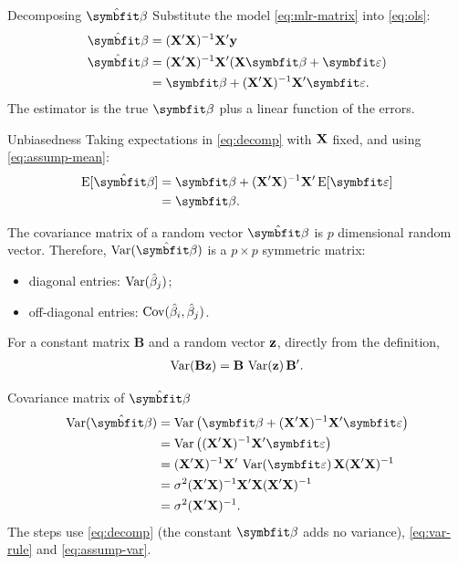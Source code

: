 \begin{frame}{Decomposing $\hat{\bbeta}$}
    Substitute the model \eqref{eq:mlr-matrix} into \eqref{eq:ols}:
    \begin{align}
        \hat{\bbeta} &= (\bX'\bX)^{-1}\bX' \by \notag\\
        \hat{\bbeta} &= (\bX'\bX)^{-1}\bX'(\bX\bbeta + \bvarepsilon) \notag\\
        &= \bbeta + (\bX'\bX)^{-1}\bX'\bvarepsilon. \label{eq:decomp}
    \end{align}
    The estimator is the true $\bbeta$ plus a linear function of the errors.
\end{frame}


\begin{frame}{Unbiasedness}
    Taking expectations in \eqref{eq:decomp} with $\mathbf{X}$ fixed, and using \eqref{eq:assump-mean}:
    \begin{align*}
        \E[\hat{\bbeta}] &= \bbeta + (\bX'\bX)^{-1}\bX'\E[\bvarepsilon] \\
        &= \bbeta.
    \end{align*}
\end{frame}


\begin{frame}{The covariance matrix of a random vector}
    \(\hat{\bbeta}\) is \(p\) dimensional random vector. Therefore, \(\Var(\hat{\bbeta})\) is a $p\times p$ symmetric matrix:
    \begin{itemize}
        \item diagonal entries: $\operatorname{Var}(\hat\beta_j)$;
        \item off-diagonal entries: $\operatorname{Cov}(\hat\beta_i,\hat\beta_j)$.
    \end{itemize}
    For a constant matrix $\mathbf{B}$ and a random vector $\mathbf{z}$, directly from the definition,
    \begin{align}
        \operatorname{Var}(\mathbf{B}\mathbf{z}) = \mathbf{B}\,\operatorname{Var}(\mathbf{z})\,\mathbf{B}'. \label{eq:var-rule}
    \end{align}
\end{frame}


\begin{frame}{Covariance matrix of $\hat{\bbeta}$}
    \begin{align}
        \Var(\hat{\bbeta}) &= \Var\big(\bbeta + (\bX'\bX)^{-1}\bX'\bvarepsilon\big) \notag\\
         &= \Var\big((\bX'\bX)^{-1}\bX'\bvarepsilon\big) \notag\\
        &= (\bX'\bX)^{-1}\bX'\,\Var(\bvarepsilon)\,\bX(\bX'\bX)^{-1} \notag\\
        &= \sigma^2(\bX'\bX)^{-1}\bX'\bX(\bX'\bX)^{-1} \notag\\
        &= \sigma^2(\bX'\bX)^{-1}. \label{eq:cov-beta}
    \end{align}
    The steps use \eqref{eq:decomp} (the constant $\bbeta$ adds no variance), \eqref{eq:var-rule} and \eqref{eq:assump-var}.
\end{frame}



